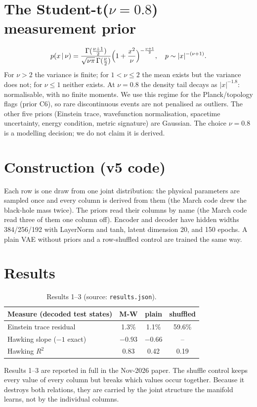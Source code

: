 \documentclass[10pt,twocolumn]{article}
\begin{document}
\section{The Student-t($\nu=0.8$) measurement prior}
\[
p(x\,|\,\nu)=\frac{\Gamma(\frac{\nu+1}{2})}{\sqrt{\nu\pi}\,\Gamma(\frac{\nu}{2})}
\Bigl(1+\frac{x^2}{\nu}\Bigr)^{-\frac{\nu+1}{2}},\quad p\sim|x|^{-(\nu+1)}.
\]
For $\nu>2$ the variance is finite; for $1<\nu\le2$ the mean exists but the variance does not;
for $\nu\le1$ neither exists. At $\nu=0.8$ the density tail decays as $|x|^{-1.8}$: normalisable,
with no finite moments. We use this regime for the Planck/topology flags (prior C6), so rare
discontinuous events are not penalised as outliers. The other five priors (Einstein trace,
wavefunction normalisation, spacetime uncertainty, energy condition, metric signature) are
Gaussian. The choice $\nu=0.8$ is a modelling decision; we do not claim it is derived.

\section{Construction (v5 code)}
Each row is one draw from one joint distribution: the physical parameters are sampled once and
every column is derived from them (the March code drew the black-hole mass twice). The priors read
their columns by name (the March code read three of them one column off). Encoder and decoder have
hidden widths 384/256/192 with LayerNorm and tanh, latent dimension 20, and 150 epochs. A plain VAE
without priors and a row-shuffled control are trained the same way.

\section{Results}
\begin{table}[h]\centering\small
\begin{tabular}{@{}lccc@{}}\toprule
Measure (decoded test states) & M-W & plain & shuffled\\\midrule
Einstein trace residual & 1.3\% & 1.1\% & 59.6\%\\
Hawking slope ($-1$ exact) & $-0.93$ & $-0.66$ & --\\
Hawking $R^2$ & 0.83 & 0.42 & 0.19\\\bottomrule
\end{tabular}
\caption{Results 1--3 (source: \texttt{results.json}).}
\end{table}
Results 1--3 are reported in full in the Nov-2026 paper. The shuffle control keeps every value of
every column but breaks which values occur together. Because it destroys both relations, they
are carried by the joint structure the manifold learns, not by the individual columns.
\end{document}
